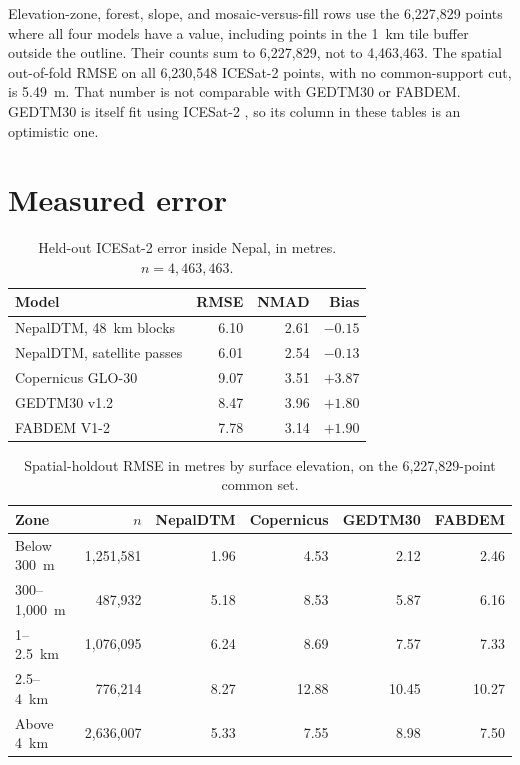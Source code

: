 \documentclass[11pt]{article}
\begin{document}
Elevation-zone, forest, slope, and mosaic-versus-fill rows use the 6,227,829 points where all four models have a value, including points in the 1~km tile buffer outside the outline.
Their counts sum to 6,227,829, not to 4,463,463.
The spatial out-of-fold RMSE on all 6,230,548 ICESat-2 points, with no common-support cut, is 5.49~m.
That number is not comparable with GEDTM30 or FABDEM.
GEDTM30 is itself fit using ICESat-2 \citep{ho2025gedtm30}, so its column in these tables is an optimistic one.

\section{Measured error}

\begin{table}[ht]
  \centering
  \caption{Held-out ICESat-2 error inside Nepal, in metres. $n = 4{,}463{,}463$.}
  \label{tab:national}
  \begin{tabular}{@{}lrrr@{}}
    \toprule
    Model & RMSE & NMAD & Bias \\
    \midrule
    NepalDTM, 48~km blocks & 6.10 & 2.61 & $-0.15$ \\
    NepalDTM, satellite passes & 6.01 & 2.54 & $-0.13$ \\
    Copernicus GLO-30 & 9.07 & 3.51 & $+3.87$ \\
    GEDTM30 v1.2 & 8.47 & 3.96 & $+1.80$ \\
    FABDEM V1-2 & 7.78 & 3.14 & $+1.90$ \\
    \bottomrule
  \end{tabular}
\end{table}

\begin{table}[ht]
  \centering
  \caption{Spatial-holdout RMSE in metres by surface elevation, on the 6,227,829-point common set.}
  \begin{tabular}{@{}lrrrrr@{}}
    \toprule
    Zone & $n$ & NepalDTM & Copernicus & GEDTM30 & FABDEM \\
    \midrule
    Below 300~m & 1,251,581 & 1.96 & 4.53 & 2.12 & 2.46 \\
    300--1,000~m & 487,932 & 5.18 & 8.53 & 5.87 & 6.16 \\
    1--2.5~km & 1,076,095 & 6.24 & 8.69 & 7.57 & 7.33 \\
    2.5--4~km & 776,214 & 8.27 & 12.88 & 10.45 & 10.27 \\
    Above 4~km & 2,636,007 & 5.33 & 7.55 & 8.98 & 7.50 \\
    \bottomrule
  \end{tabular}
\end{table}
\end{document}
